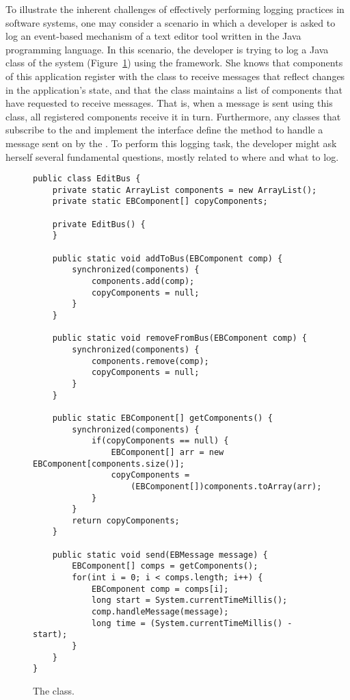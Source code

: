 To illustrate the inherent challenges of effectively performing logging practices in software systems, one may consider a scenario in which a developer is asked to log an event-based mechanism of a text editor tool written in the Java programming language. In this scenario, the developer is trying to log a Java class of the system (Figure~\ref{ch2-ex}) using the  framework. She knows that components of this application register with the  class to receive messages that reflect changes in the application's state, and that the  class maintains a list of components that have requested to receive messages. That is, when a message is sent using this class, all registered components receive it in turn. Furthermore, any classes that subscribe to the  and implement the  interface define the method  to handle a message sent on by the . To perform this logging task, the developer might ask herself several fundamental questions, mostly related to where and what to log.


\begin{figure}[p]
\def\baselinestretch{1}
\begin{lstlisting}
public class EditBus {
    private static ArrayList components = new ArrayList();
    private static EBComponent[] copyComponents;

    private EditBus() {
    }

    public static void addToBus(EBComponent comp) {
        synchronized(components) {
            components.add(comp);
            copyComponents = null;
        }
    }

    public static void removeFromBus(EBComponent comp) {
        synchronized(components) {
            components.remove(comp);
            copyComponents = null;
        }
    }

    public static EBComponent[] getComponents() {
        synchronized(components) {
            if(copyComponents == null) {
                EBComponent[] arr = new EBComponent[components.size()];
                copyComponents =
                    (EBComponent[])components.toArray(arr);
            }
        }
        return copyComponents;
    }

    public static void send(EBMessage message) {
        EBComponent[] comps = getComponents();
        for(int i = 0; i < comps.length; i++) {
            EBComponent comp = comps[i];
            long start = System.currentTimeMillis();
            comp.handleMessage(message);
            long time = (System.currentTimeMillis() - start);
        }
    }
}
\end{lstlisting}
\caption{The  class.\label{ch2-ex}}
\end{figure}

